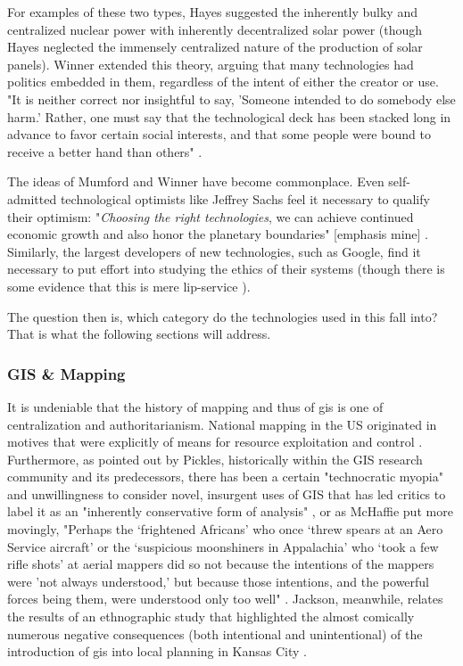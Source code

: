 For examples of these two types, Hayes suggested the inherently bulky and centralized nuclear power with inherently decentralized solar power \cite{hayesRaysHopeTransition1977} (though Hayes neglected the immensely centralized nature of the production of solar panels). Winner extended this theory, arguing that many technologies had politics embedded in them, regardless of the intent of either the creator or use. "It is neither correct nor insightful to say, 'Someone intended to do somebody else harm.' Rather, one must say that the technological deck has been stacked long in advance to favor certain social interests, and that some people were bound to receive a better hand than others" \cite{winnerArtifactsHavePolitics1980}.

The ideas of Mumford and Winner have become commonplace. Even self-admitted technological optimists like Jeffrey Sachs \cite{sachsOptimismNewYear2021} feel it necessary to qualify their optimism: "\textit{Choosing the right technologies}, we can achieve continued economic growth and also honor the planetary boundaries" [emphasis mine] \cite{sachsAgeSustainableDevelopment2015}. Similarly, the largest developers of new technologies, such as Google, find it necessary to put effort into studying the ethics of their systems (though there is some evidence that this is mere lip-service \cite{simoniteWhatReallyHappened}). 

The question then is, which category do the technologies used in this fall into? That is what the following sections will address.

\subsubsection{GIS \& Mapping} \label{sec:mapping_critique}

It is undeniable that the history of mapping and thus of \ac{gis} is one of centralization and authoritarianism. National mapping in the US originated in motives that were explicitly of means for resource exploitation and control \cite{mchaffieManufacturingMetaphors1994}. Furthermore, as pointed out by Pickles, historically within the GIS research community and its predecessors, there has been a certain "technocratic myopia" and unwillingness to consider novel, insurgent uses of GIS that has led critics to label it as an "inherently conservative form of analysis" \cite{picklesRepresentationsElectronicAge1994}, or as McHaffie put more movingly, "Perhaps the `frightened Africans' who once `threw spears at an Aero Service aircraft' or the `suspicious moonshiners in Appalachia' who `took a few rifle shots' at aerial mappers did so not because the intentions of the mappers were 'not always understood,' but because those intentions, and the powerful forces being them, were understood only too well" \cite{mchaffieManufacturingMetaphors1994}. Jackson, meanwhile, relates the results of an ethnographic study that highlighted the almost comically numerous negative consequences (both intentional and unintentional) of the introduction of \ac{gis} into local planning in Kansas City \cite{jacksonCityThirtyThousand2008}.

